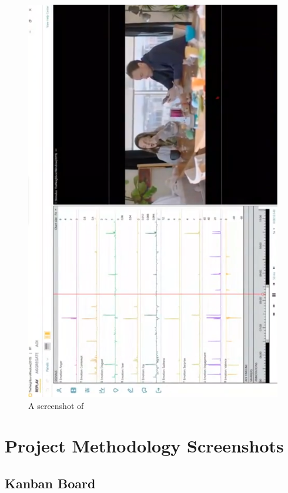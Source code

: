 \documentclass[12pt, a4paper]{article}
\begin{document}
\begin{appendices}
\begin{figure}[H]
    \centering
    \includegraphics[scale=0.48]{images/imotions.png}
    \caption{A screenshot of \cite{imotions}}
    \label{fig:essimotions}
\end{figure}
\section{Project Methodology Screenshots}
\label{appendix:pmss}

\subsection{Kanban Board}
\label{appendix:kanban}


\end{appendices}
\end{document}
